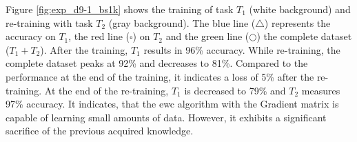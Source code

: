 Figure \ref{fig:exp_d9-1_bs1k} shows the training of task $T_1$ (white background) and re-training with task $T_2$ (gray background).
The blue line ($\triangle$) represents the accuracy on $T_1$, the red line ($\square$) on $T_2$ and the green line ($\bigcirc$) the complete dataset ($T_1 + T_2$).
After the training, $T_1$ results in 96\% accuracy.
While re-training, the complete dataset peaks at 92\% and decreases to 81\%.
Compared to the performance at the end of the training, it indicates a loss of 5\% after the re-training.
At the end of the re-training, $T_1$ is decreased to 79\% and $T_2$ measures 97\% accuracy.
\newline
It indicates, that the \acrshort{ewc} algorithm with the Gradient matrix is capable of learning small amounts of data.
However, it exhibits a significant sacrifice of the previous acquired knowledge.

